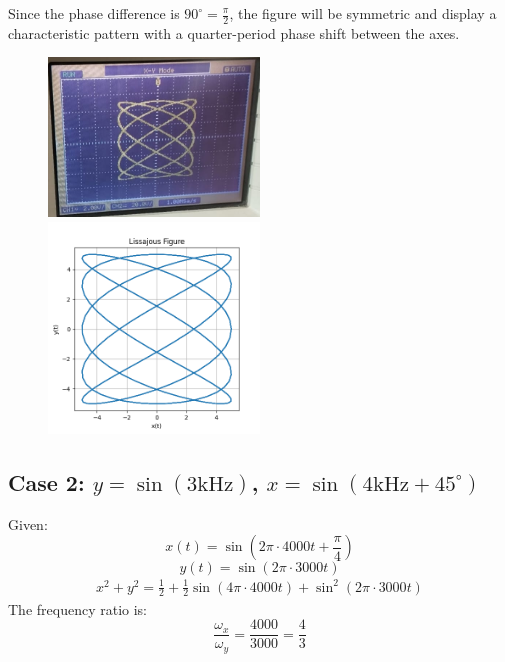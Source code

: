 \documentclass{article}
\begin{document}
Since the phase difference is \( 90^\circ = \frac{\pi}{2} \), the figure will be symmetric and display a characteristic pattern with a quarter-period phase shift between the axes.
\begin{figure}[H]
\centering
\includegraphics[width=0.5\textwidth]{figs/fig1.png}
\includegraphics[width=0.5\textwidth]{figs/fig1_verify.png}
\end{figure}
\subsection{Case 2: $y = \sin(3\text{kHz})$, $x = \sin(4\text{kHz} + 45^\circ)$}

Given:
\[
x(t) = \sin(2\pi \cdot 4000 t + \frac{\pi}{4})
\]
\[
y(t) = \sin(2\pi \cdot 3000 t)
\]
\begin{align*}
x^2 + y^2 = \frac{1}{2} + \frac{1}{2} \sin\left( 4\pi \cdot 4000 t \right) + \sin^2\left( 2\pi \cdot 3000 t \right)
\end{align*}
The frequency ratio is:
\[
\frac{\omega_x}{\omega_y} = \frac{4000}{3000} = \frac{4}{3}
\]
\end{document}
